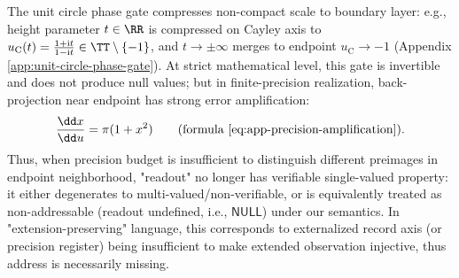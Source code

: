 \begin{remark}\label{rem:xi-null-finite-precision}
The unit circle phase gate compresses non-compact scale to boundary layer: e.g., height parameter \(t\in\RR\) is compressed on Cayley axis to \(u_{\mathrm C}(t)=\frac{1+\mathrm{i}t}{1-\mathrm{i}t}\in\TT\setminus\{-1\}\), and \(t\to\pm\infty\) merges to endpoint \(u_{\mathrm C}\to-1\) (Appendix \ref{app:unit-circle-phase-gate}).
At strict mathematical level, this gate is invertible and does not produce null values; but in finite-precision realization, back-projection near endpoint has strong error amplification:
\[
\frac{\dd x}{\dd u}=\pi(1+x^2)
\qquad\text{(formula \eqref{eq:app-precision-amplification})}.
\]
Thus, when precision budget is insufficient to distinguish different preimages in endpoint neighborhood, "readout" no longer has verifiable single-valued property: it either degenerates to multi-valued/non-verifiable, or is equivalently treated as non-addressable (readout undefined, i.e., \(\mathsf{NULL}\)) under our semantics.
In "extension-preserving" language, this corresponds to externalized record axis (or precision register) being insufficient to make extended observation injective, thus address is necessarily missing.
\end{remark}




